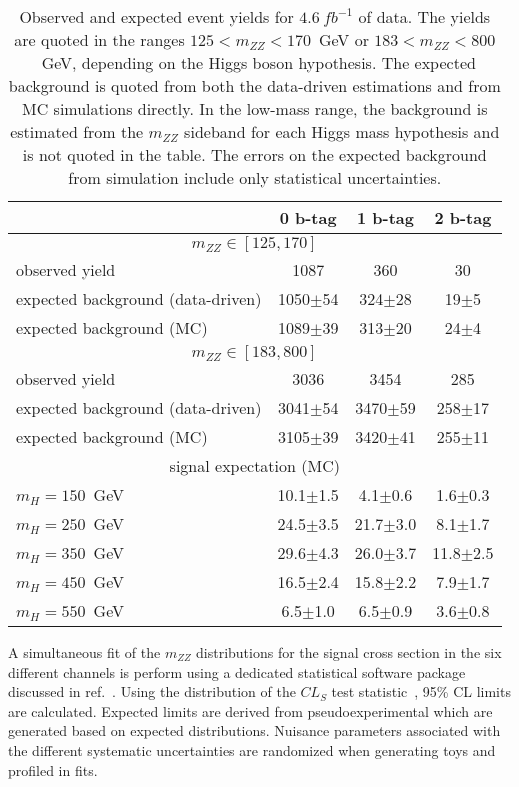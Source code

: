\begin{table}
\begin{center}
\begin{tabular}{l|c|c|c}
\hline \hline
 & 0 b-tag & 1 b-tag & 2 b-tag \\ \hline \hline
\multicolumn{4}{c}{$m_{ZZ} \in [125,170]$} \\ \hline
observed yield & 1087 & 360  & 30 \\
expected background (data-driven) & 1050$\pm$54 & 324$\pm$28 & 19$\pm$5 \\ 
expected background (MC)& 1089$\pm$39 & 313$\pm$20 & 24$\pm$4 \\ \hline \hline
\multicolumn{4}{c}{$m_{ZZ} \in [183,800]$} \\ \hline
observed yield & 3036 & 3454  & 285 \\
expected background (data-driven) & 3041$\pm$54 & 3470$\pm$59 & 258$\pm$17 \\ 
expected background (MC)& 3105$\pm$39 & 3420$\pm$41 & 255$\pm$11 \\ \hline \hline
\multicolumn{4}{c}{signal expectation (MC)} \\  \hline
$m_H=150$~GeV & 10.1$\pm$1.5 & 4.1$\pm$0.6 & 1.6$\pm$0.3 \\ \hline
$m_H=250$~GeV & 24.5$\pm$3.5 & 21.7$\pm$3.0 & 8.1$\pm$1.7 \\ \hline
$m_H=350$~GeV & 29.6$\pm$4.3 & 26.0$\pm$3.7 & 11.8$\pm$2.5 \\ \hline
$m_H=450$~GeV & 16.5$\pm$2.4 & 15.8$\pm$2.2 & 7.9$\pm$1.7 \\ \hline
$m_H=550$~GeV & 6.5$\pm$1.0 & 6.5$\pm$0.9 & 3.6$\pm$0.8 \\ \hline
\hline \hline
\end{tabular}
\caption{Observed and expected event yields for $4.6~fb^{-1}$ of
data.  The yields are quoted  in the ranges $125<m_{ZZ}<170$~GeV
or $183<m_{ZZ}<800$~GeV, depending on the Higgs boson hypothesis.
The expected  background is quoted from both the data-driven 
estimations and from MC simulations directly. In the low-mass
range, the background  is estimated from the $m_{ZZ}$ sideband
for each  Higgs mass hypothesis and is not quoted in the table.
The errors on the expected  background  from simulation include
only statistical uncertainties.}
\label{table:HZZ2l2qYields}
\end{center}
\end{table}

A simultaneous fit of the $m_{ZZ}$ distributions for the signal 
cross section in the six different channels is perform using a 
dedicated statistical software package discussed in ref.~\cite{Chatrchyan:2012tx}.  Using the distribution of the $CL_S$ test 
statistic~\cite{Read:2002hq}, 95\% CL limits are calculated.
Expected limits are derived from pseudoexperimental which are 
generated based on expected distributions.  Nuisance parameters 
associated with the different systematic uncertainties are 
randomized when generating toys and profiled in fits.  

